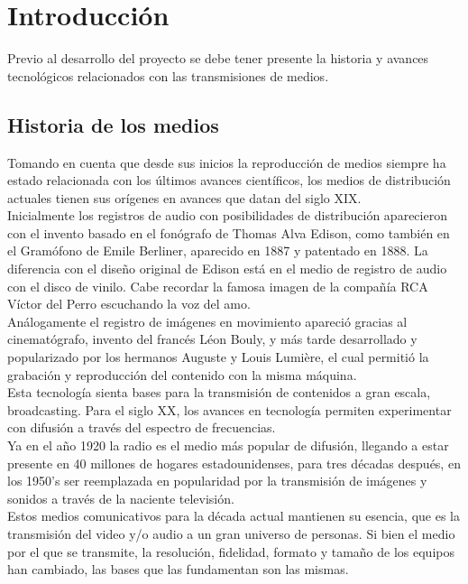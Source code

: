 \chapter{Introducción}
Previo al desarrollo del proyecto se debe tener presente la historia y avances tecnológicos relacionados con las transmisiones de medios.
\section{Historia de los medios}
Tomando en cuenta que desde sus inicios la reproducción de medios siempre ha estado relacionada con los últimos avances científicos, los medios de distribución actuales tienen sus orígenes en avances que datan  del siglo XIX.\\

Inicialmente los registros de audio con posibilidades de distribución aparecieron con el invento basado en el fonógrafo de Thomas Alva Edison, como también en el Gramófono de Emile Berliner, aparecido en 1887 y patentado en 1888. La diferencia con el diseño original de Edison está en el medio de registro de audio con el disco de vinilo. Cabe recordar la famosa imagen de la compañía RCA Víctor del Perro escuchando la voz del amo.\\

Análogamente el registro de imágenes en movimiento apareció gracias al cinematógrafo, invento del francés Léon Bouly, y más tarde desarrollado y popularizado por los hermanos Auguste y Louis Lumière, el cual permitió la grabación y reproducción del contenido con la misma máquina.\\

Esta tecnología sienta bases para la transmisión de contenidos a gran escala, broadcasting. Para el siglo XX, los avances en tecnología permiten experimentar con difusión a través del espectro de frecuencias.\\

 Ya en el año 1920 la radio es el medio más popular de difusión, llegando a estar presente en 40 millones de hogares estadounidenses, para tres décadas después, en los 1950’s ser reemplazada en popularidad por la transmisión de imágenes y sonidos a través de la naciente televisión.\\

	Estos medios comunicativos para la década actual mantienen su esencia, que es la transmisión del video y/o audio a un gran universo de personas. Si bien el medio por el que se transmite, la resolución, fidelidad, formato y tamaño de los equipos han cambiado, las bases que las fundamentan son las mismas.\\
	
